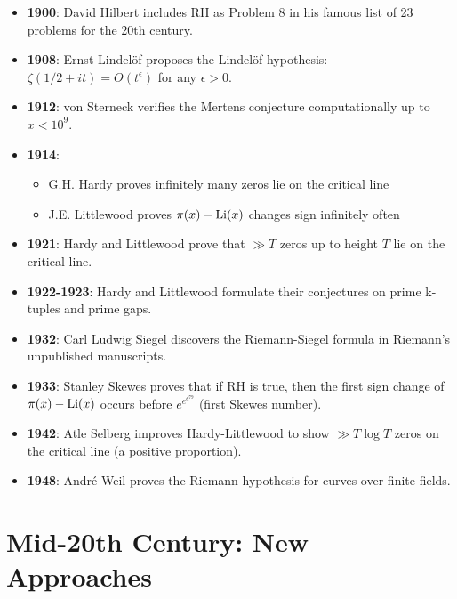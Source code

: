 \begin{itemize}
\item \textbf{1900}: David Hilbert includes RH as Problem 8 in his famous list of 23 problems for the 20th century.

\item \textbf{1908}: Ernst Lindel\"of proposes the Lindel\"of hypothesis: $\zeta(1/2 + it) = O(t^\epsilon)$ for any $\epsilon > 0$.

\item \textbf{1912}: von Sterneck verifies the Mertens conjecture computationally up to $x < 10^9$.

\item \textbf{1914}: 
  \begin{itemize}
  \item G.H. Hardy proves infinitely many zeros lie on the critical line
  \item J.E. Littlewood proves $\pi(x) - \operatorname{Li}(x)$ changes sign infinitely often
  \end{itemize}

\item \textbf{1921}: Hardy and Littlewood prove that $\gg T$ zeros up to height $T$ lie on the critical line.

\item \textbf{1922-1923}: Hardy and Littlewood formulate their conjectures on prime k-tuples and prime gaps.

\item \textbf{1932}: Carl Ludwig Siegel discovers the Riemann-Siegel formula in Riemann's unpublished manuscripts.

\item \textbf{1933}: Stanley Skewes proves that if RH is true, then the first sign change of $\pi(x) - \operatorname{Li}(x)$ occurs before $e^{e^{e^{79}}}$ (first Skewes number).

\item \textbf{1942}: Atle Selberg improves Hardy-Littlewood to show $\gg T \log T$ zeros on the critical line (a positive proportion).

\item \textbf{1948}: Andr\'e Weil proves the Riemann hypothesis for curves over finite fields.
\end{itemize}

\section*{Mid-20th Century: New Approaches}

